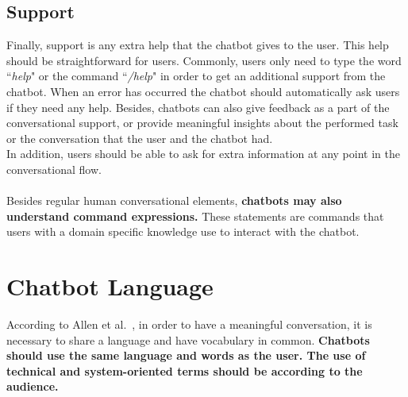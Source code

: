 \documentclass[a4paper,10pt]{article}
\begin{document}
\subsection{Support}
Finally, support is any extra help that the chatbot gives to the user. This help should be straightforward for users. Commonly, users only need to type the word ``\textit{help}" or the command ``\textit{/help}" in order to get an additional support from the chatbot. When an error has occurred the chatbot should automatically ask users if they need any help. Besides, chatbots can also give feedback as a part of the conversational support, or provide meaningful insights about the performed task or the conversation that the user and the chatbot had.\\[0\baselineskip] In addition, users should be able to ask for extra information at any point in the conversational flow.
\\
\\
Besides regular human conversational elements, \textbf{chatbots may also understand command expressions.} These statements are commands that users with a domain specific knowledge use to interact with the chatbot.


\section{Chatbot Language}
According to Allen et al.~\cite{allen1978conversation}, in order to have a meaningful conversation, it is necessary to share a language and have vocabulary in common. \textbf{Chatbots should use the same language and words as the user. The use of technical and system-oriented terms should be according to the audience.} 
\end{document}
